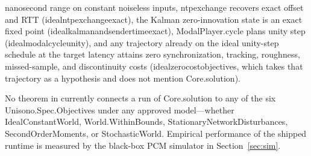 \documentclass[11pt,a4paper]{article}
\DeclareRobustCommand{\lean}[1]{{\ttfamily\def\_{\textunderscore\allowbreak}#1}}
\theoremstyle{definition}
\begin{document}
\begin{itemize}
  nanosecond range on constant noiseless inputs, \lean{ntp\_exchange} recovers
  exact offset and RTT (\lean{ideal\_ntp\_exchange\_exact}), the Kalman
  zero-innovation state is an exact fixed point
  (\lean{ideal\_kalman\_and\_sender\_time\_exact}),
  \lean{ModalPlayer.\allowbreak cycle} plans unity step
  (\lean{ideal\_modal\_cycle\_unity}), and any trajectory already on the ideal
  unity-step schedule at the target latency attains zero synchronization,
  tracking, roughness, missed-sample, and discontinuity costs
  (\lean{ideal\_zero\_cost\_objectives}, which takes that trajectory as a
  hypothesis and does not mention \lean{Core.\allowbreak solution}).
\end{itemize}
No theorem in  currently connects a run of
\lean{Core.\allowbreak solution} to any of the six
\lean{Unisono.\allowbreak Spec.\allowbreak Objectives} under any approved
model—whether \lean{IdealConstantWorld}, \lean{World.\allowbreak WithinBounds},
\lean{StationaryNetworkDisturbances}, \lean{SecondOrderMoments}, or
\lean{StochasticWorld}. Empirical performance of the shipped runtime is
measured by the black-box PCM simulator in Section~\ref{sec:sim}.
\end{document}
